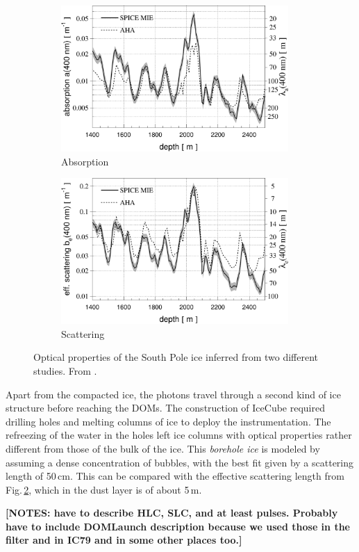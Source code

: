 \documentclass[../Main.tex]{subfiles}
\begin{document}
\begin{figure}[bth]
  \centering
  \begin{subfigure}[c]{0.49\textwidth}
    \centering
    \includegraphics[width=0.95\textwidth]{IceAbsorption}
    \caption{Absorption}
    \label{fig:IceAbsorption}
  \end{subfigure}
  \begin{subfigure}[c]{0.49\textwidth}
    \centering
    \includegraphics[width=0.95\textwidth]{IceScattering}
    \caption{Scattering}
    \label{fig:IceScattering}
  \end{subfigure}
  \caption[Optical properties of the South Pole ice.]{Optical properties of the South Pole ice inferred from two different studies. From \cite{ice2}.}
  \label{fig:IceProperties}
\end{figure}

Apart from the compacted ice, the photons travel through a second kind of ice structure before reaching the DOMs. The construction of IceCube required drilling holes and melting columns of ice to deploy the instrumentation. The refreezing of the water in the holes left ice columns with optical properties rather different from those of the bulk of the ice. This \textit{borehole ice} is modeled by assuming a dense concentration of bubbles, with the best fit given by a scattering length of 50\,cm. This can be compared with the effective scattering length from Fig.\,\ref{fig:IceScattering}, which in the dust layer is of about 5\,m.



\textbf{[NOTES: have to describe HLC, SLC, and at least pulses. Probably have
  to include DOMLaunch description because we used those in the filter
  and in IC79 and in some other places too.]}
\end{document}

